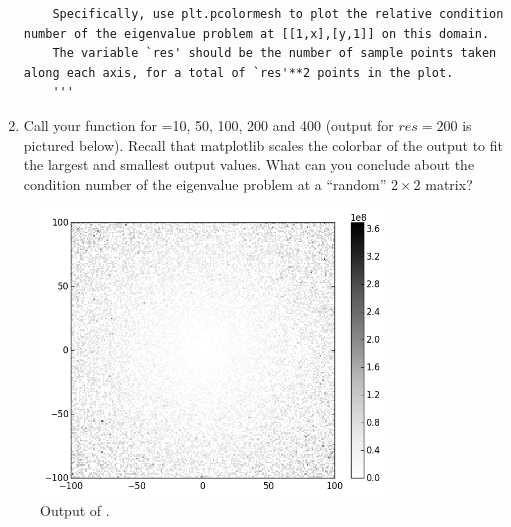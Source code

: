 \begin{problem}[Optional]
\begin{enumerate}
\begin{lstlisting}
    Specifically, use plt.pcolormesh to plot the relative condition number of the eigenvalue problem at [[1,x],[y,1]] on this domain.
    The variable `res' should be the number of sample points taken along each axis, for a total of `res'**2 points in the plot.
    '''
\end{lstlisting}
\item Call your function for =10, 50, 100, 200 and 400 (output for $res=200$ is pictured below). Recall that matplotlib scales the colorbar of the output to fit the largest and smallest output values.
What can you conclude about the condition number of the eigenvalue problem at a ``random'' $2\times2$ matrix?
\end{enumerate}
\begin{figure}[H]
\includegraphics[height=3in]{eigenvalue_conditioning.png}
\caption{Output of .}
\label{fig:wilkinsonpolynomial_many}
\end{figure}
\end{problem}

%
%
%

